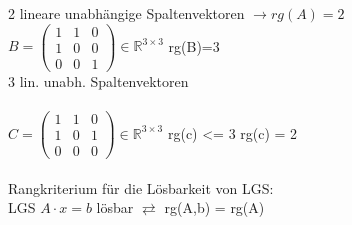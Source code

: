 \documentclass{scrartcl}
\begin{document}
2 lineare unabhängige Spaltenvektoren $\rightarrow rg(A) = 2$\\
$B = \begin{pmatrix}
	1 & 1 & 0 \\ 1 & 0 & 0 \\ 0 & 0 & 1
\end{pmatrix} \in \mathbb{R}^{3 \times 3}$ \hspace{2cm } rg(B)=3 \\
3 lin. unabh. Spaltenvektoren\\
\\
$C= \begin{pmatrix}
	1 & 1 & 0 \\ 1 & 0 & 1 \\ 0 & 0 & 0
\end{pmatrix} \in \mathbb{R}^{3 \times 3}$ \hspace{1cm} rg(c) <= 3 \hspace{1 cm} rg(c) = 2\\\\
Rangkriterium für die Lösbarkeit von LGS:\\
LGS $A \cdot x = b$ lösbar $\rightleftarrows$ rg(A,b) = rg(A) 
\end{document}
